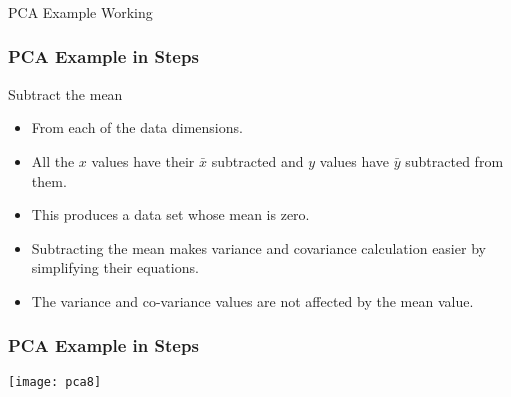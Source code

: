 

\begin{frame}[fragile]\frametitle{}
\begin{center}
{\Large PCA Example Working}
\end{center}
\end{frame}


\begin{frame}[fragile] \frametitle{PCA Example in Steps} 
Subtract the mean
\begin{itemize}
\item From each of the data dimensions. 
\item All the $x$ values have their $\bar{x}$ subtracted and $y$ values have $\bar{y}$ subtracted 
from them. 
\item This produces a data set whose mean is zero.
\item Subtracting the mean makes variance and covariance 
calculation easier by simplifying their equations. 
\item The 
variance and co-variance values are not affected by 
the mean value.
\end{itemize}
\end{frame}


\begin{frame}[fragile] \frametitle{PCA Example in Steps} 
\begin{center}
\texttt{[image: pca8]}
\end{center}
\end{frame}

